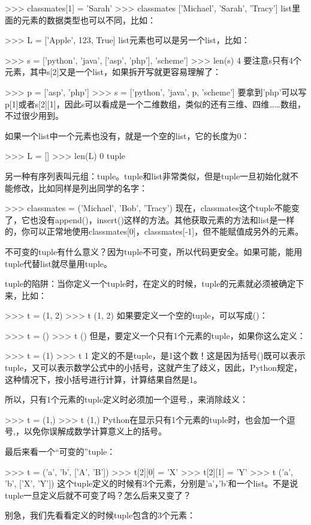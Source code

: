 \documentclass[10pt,a4paper]{ctexbook}
\begin{document}
>>> classmates[1] = 'Sarah'
>>> classmates
['Michael', 'Sarah', 'Tracy']
list里面的元素的数据类型也可以不同，比如：

>>> L = ['Apple', 123, True]
list元素也可以是另一个list，比如：

>>> s = ['python', 'java', ['asp', 'php'], 'scheme']
>>> len(s)
4
要注意s只有4个元素，其中s[2]又是一个list，如果拆开写就更容易理解了：

>>> p = ['asp', 'php']
>>> s = ['python', 'java', p, 'scheme']
要拿到'php'可以写p[1]或者s[2][1]，因此s可以看成是一个二维数组，类似的还有三维、四维……数组，不过很少用到。

如果一个list中一个元素也没有，就是一个空的list，它的长度为0：

>>> L = []
>>> len(L)
0
tuple

另一种有序列表叫元组：tuple。tuple和list非常类似，但是tuple一旦初始化就不能修改，比如同样是列出同学的名字：

>>> classmates = ('Michael', 'Bob', 'Tracy')
现在，classmates这个tuple不能变了，它也没有append()，insert()这样的方法。其他获取元素的方法和list是一样的，你可以正常地使用classmates[0]，classmates[-1]，但不能赋值成另外的元素。

不可变的tuple有什么意义？因为tuple不可变，所以代码更安全。如果可能，能用tuple代替list就尽量用tuple。

tuple的陷阱：当你定义一个tuple时，在定义的时候，tuple的元素就必须被确定下来，比如：

>>> t = (1, 2)
>>> t
(1, 2)
如果要定义一个空的tuple，可以写成()：

>>> t = ()
>>> t
()
但是，要定义一个只有1个元素的tuple，如果你这么定义：

>>> t = (1)
>>> t
1
定义的不是tuple，是1这个数！这是因为括号()既可以表示tuple，又可以表示数学公式中的小括号，这就产生了歧义，因此，Python规定，这种情况下，按小括号进行计算，计算结果自然是1。

所以，只有1个元素的tuple定义时必须加一个逗号,，来消除歧义：

>>> t = (1,)
>>> t
(1,)
Python在显示只有1个元素的tuple时，也会加一个逗号,，以免你误解成数学计算意义上的括号。

最后来看一个“可变的”tuple：

>>> t = ('a', 'b', ['A', 'B'])
>>> t[2][0] = 'X'
>>> t[2][1] = 'Y'
>>> t
('a', 'b', ['X', 'Y'])
这个tuple定义的时候有3个元素，分别是'a'，'b'和一个list。不是说tuple一旦定义后就不可变了吗？怎么后来又变了？

别急，我们先看看定义的时候tuple包含的3个元素：
\end{document}
